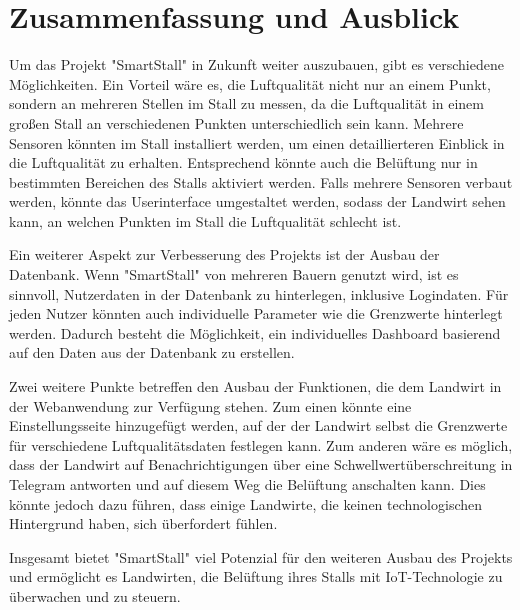 \documentclass[conference]{IEEEtran}
\begin{document}
\section{Zusammenfassung und Ausblick}
Um das Projekt "SmartStall" in Zukunft weiter auszubauen, gibt es verschiedene Möglichkeiten. Ein Vorteil wäre es, die Luftqualität nicht nur an einem Punkt, sondern an mehreren Stellen im Stall zu messen, da die Luftqualität in einem großen Stall an verschiedenen Punkten unterschiedlich sein kann. Mehrere Sensoren könnten im Stall installiert werden, um einen detaillierteren Einblick in die Luftqualität zu erhalten. Entsprechend könnte auch die Belüftung nur in bestimmten Bereichen des Stalls aktiviert werden. Falls mehrere Sensoren verbaut werden, könnte das Userinterface umgestaltet werden, sodass der Landwirt sehen kann, an welchen Punkten im Stall die Luftqualität schlecht ist.

Ein weiterer Aspekt zur Verbesserung des Projekts ist der Ausbau der Datenbank. Wenn "SmartStall" von mehreren Bauern genutzt wird, ist es sinnvoll, Nutzerdaten in der Datenbank zu hinterlegen, inklusive Logindaten. Für jeden Nutzer könnten auch individuelle Parameter wie die Grenzwerte hinterlegt werden. Dadurch besteht die Möglichkeit, ein individuelles Dashboard basierend auf den Daten aus der Datenbank zu erstellen.

Zwei weitere Punkte betreffen den Ausbau der Funktionen, die dem Landwirt in der Webanwendung zur Verfügung stehen. Zum einen könnte eine Einstellungsseite hinzugefügt werden, auf der der Landwirt selbst die Grenzwerte für verschiedene Luftqualitätsdaten festlegen kann. Zum anderen wäre es möglich, dass der Landwirt auf Benachrichtigungen über eine Schwellwertüberschreitung in Telegram antworten und auf diesem Weg die Belüftung anschalten kann. Dies könnte jedoch dazu führen, dass einige Landwirte, die keinen technologischen Hintergrund haben, sich überfordert fühlen.

Insgesamt bietet "SmartStall" viel Potenzial für den weiteren Ausbau des Projekts und ermöglicht es Landwirten, die Belüftung ihres Stalls mit IoT-Technologie zu überwachen und zu steuern.
\end{document}
